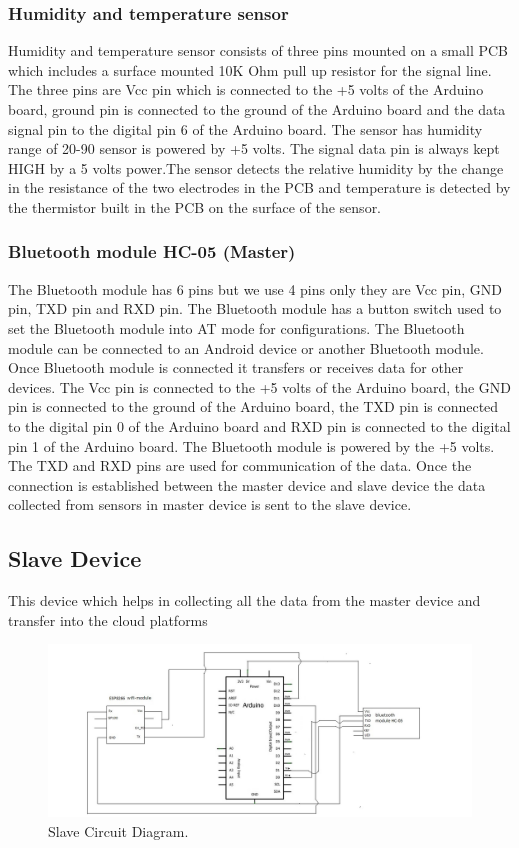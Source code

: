\subsubsection{Humidity and temperature sensor}
Humidity and temperature sensor consists of three pins mounted on a small PCB which includes a surface mounted 10K Ohm pull up resistor for the signal line. The three pins are Vcc pin which is connected to the +5 volts of the Arduino board, ground pin is connected to the ground of the Arduino board and the data signal pin to the digital pin 6 of the Arduino board. The sensor has humidity range of 20-90%
sensor is powered by +5 volts. The signal data pin is always kept HIGH by a 5 volts power.The sensor detects the relative humidity by the change in the resistance of the two electrodes in the PCB and temperature is detected by the thermistor built in the PCB on the surface of the sensor.
\subsubsection{Bluetooth module HC-05 (Master)}
The Bluetooth module has 6 pins but we use 4 pins only they are Vcc pin, GND pin, TXD pin and RXD pin. The Bluetooth module has a button switch used to set the Bluetooth module into AT mode for configurations. The Bluetooth module can be connected to an Android device or another Bluetooth module. Once Bluetooth module is connected it transfers or receives data for other devices. The Vcc pin is connected to the +5 volts of the Arduino board, the GND pin is connected to the ground of the Arduino board, the TXD pin is
connected to the digital pin 0 of the Arduino board and RXD pin is connected to the digital pin 1 of the Arduino board. The Bluetooth module is powered by the +5 volts. The TXD and RXD pins are used for communication of the data. Once the connection is established between the master device and slave device the data collected from sensors in master device is sent to the slave device.
\subsection{Slave Device}
This device which helps in collecting all the data from the master device and transfer into the cloud platforms 
\begin{figure}[h]
\centerline{\includegraphics[width=5.7in]{SC}}
\caption{ Slave Circuit Diagram.}
\end{figure}
